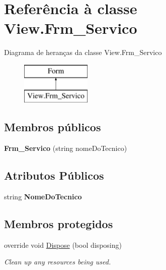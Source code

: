 \hypertarget{class_view_1_1_frm___servico}{}\section{Referência à classe View.\+Frm\+\_\+\+Servico}
\label{class_view_1_1_frm___servico}
Diagrama de heranças da classe View.\+Frm\+\_\+\+Servico\begin{figure}[H]
\begin{center}
\leavevmode
\includegraphics[height=2.000000cm]{class_view_1_1_frm___servico}
\end{center}
\end{figure}
\subsection*{Membros públicos}
\begin{DoxyCompactItemize}
\item 
\hypertarget{class_view_1_1_frm___servico_a46dc9786956d0386023054de6316db5f}{}{\bfseries Frm\+\_\+\+Servico} (string nome\+Do\+Tecnico)\label{class_view_1_1_frm___servico_a46dc9786956d0386023054de6316db5f}

\end{DoxyCompactItemize}
\subsection*{Atributos Públicos}
\begin{DoxyCompactItemize}
\item 
\hypertarget{class_view_1_1_frm___servico_a8f22f7569364274753add88da8d1e902}{}string {\bfseries Nome\+Do\+Tecnico}\label{class_view_1_1_frm___servico_a8f22f7569364274753add88da8d1e902}

\end{DoxyCompactItemize}
\subsection*{Membros protegidos}
\begin{DoxyCompactItemize}
\item 
override void \hyperlink{class_view_1_1_frm___servico_a1d52ec82fbf4fa497e663046c2131e12}{Dispose} (bool disposing)
\begin{DoxyCompactList}\small\item\em Clean up any resources being used. \end{DoxyCompactList}\end{DoxyCompactItemize}


